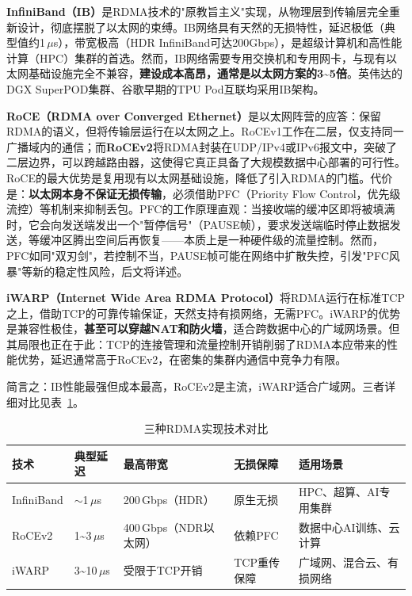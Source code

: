 \textbf{InfiniBand（IB）}是RDMA技术的"原教旨主义"实现，从物理层到传输层完全重新设计，彻底摆脱了以太网的束缚。IB网络具有天然的无损特性，延迟极低（典型值约1\,$\mu$s），带宽极高（HDR InfiniBand可达200Gbps），是超级计算机和高性能计算（HPC）集群的首选。然而，IB网络需要专用交换机和专用网卡，与现有以太网基础设施完全不兼容，\textbf{建设成本高昂，通常是以太网方案的3\textasciitilde5倍}。英伟达的DGX SuperPOD集群、谷歌早期的TPU Pod互联均采用IB架构。

\textbf{RoCE（RDMA over Converged Ethernet）}是以太网阵营的应答：保留RDMA的语义，但将传输层运行在以太网之上。RoCEv1工作在二层，仅支持同一广播域内的通信；而\textbf{RoCEv2}将RDMA封装在UDP/IPv4或IPv6报文中，突破了二层边界，可以跨越路由器，这使得它真正具备了大规模数据中心部署的可行性。RoCE的最大优势是复用现有以太网基础设施，降低了引入RDMA的门槛。代价是：\textbf{以太网本身不保证无损传输}，必须借助PFC（Priority Flow Control，优先级流控）等机制来抑制丢包。PFC的工作原理直观：当接收端的缓冲区即将被填满时，它会向发送端发出一个"暂停信号"（PAUSE帧），要求发送端临时停止数据发送，等缓冲区腾出空间后再恢复——本质上是一种硬件级的流量控制。然而，PFC如同"双刃剑"，若控制不当，PAUSE帧可能在网络中扩散失控，引发"PFC风暴"等新的稳定性风险，后文将详述。

\textbf{iWARP（Internet Wide Area RDMA Protocol）}将RDMA运行在标准TCP之上，借助TCP的可靠传输保证，天然支持有损网络，无需PFC。iWARP的优势是兼容性极佳，\textbf{甚至可以穿越NAT和防火墙}，适合跨数据中心的广域网场景。但其局限也正在于此：TCP的连接管理和流量控制开销削弱了RDMA本应带来的性能优势，延迟通常高于RoCEv2，在密集的集群内通信中竞争力有限。

简言之：IB性能最强但成本最高，RoCEv2是主流，iWARP适合广域网。三者详细对比见表~\ref{tab:rdma_compare}。

\begin{table}[h]
\centering
\caption{三种RDMA实现技术对比}
\label{tab:rdma_compare}
\begin{tabular}{lllll}
\hline
\textbf{技术} & \textbf{典型延迟} & \textbf{最高带宽} & \textbf{无损保障} & \textbf{适用场景} \\
\hline
InfiniBand & $\sim$1\,$\mu$s & 200\,Gbps（HDR） & 原生无损 & HPC、超算、AI专用集群 \\
RoCEv2 & 1\textasciitilde3\,$\mu$s & 400\,Gbps（NDR以太网） & 依赖PFC & 数据中心AI训练、云计算 \\
iWARP & 3\textasciitilde10\,$\mu$s & 受限于TCP开销 & TCP重传保障 & 广域网、混合云、有损网络 \\
\hline
\end{tabular}
\end{table}

